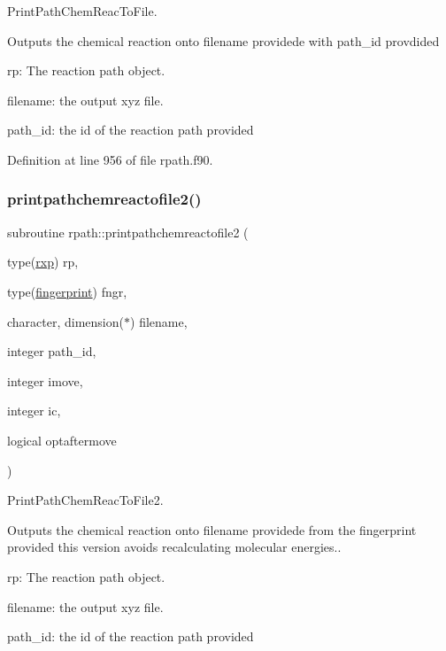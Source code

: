 Print\+Path\+Chem\+Reac\+To\+File. 

Outputs the chemical reaction onto filename providede with path\+\_\+id provdided


\begin{DoxyItemize}
\item rp\+: The reaction path object.
\item filename\+: the output xyz file.
\item path\+\_\+id\+: the id of the reaction path provided 
\end{DoxyItemize}

Definition at line 956 of file rpath.\+f90.

\mbox{\label{namespacerpath_a2b31a5d2057f07a4b4e50d900e7287cc}} 
\subsubsection{\texorpdfstring{printpathchemreactofile2()}{printpathchemreactofile2()}}
{\footnotesize\ttfamily subroutine rpath\+::printpathchemreactofile2 (\begin{DoxyParamCaption}\item[{type(\mbox{\hyperlink{structrpath_1_1rxp}{rxp}})}]{rp,  }\item[{type(\mbox{\hyperlink{structrpath_1_1fingerprint}{fingerprint}})}]{fngr,  }\item[{character, dimension($\ast$)}]{filename,  }\item[{integer}]{path\+\_\+id,  }\item[{integer}]{imove,  }\item[{integer}]{ic,  }\item[{logical}]{optaftermove }\end{DoxyParamCaption})}



Print\+Path\+Chem\+Reac\+To\+File2. 

Outputs the chemical reaction onto filename providede from the fingerprint provided this version avoids recalculating molecular energies..


\begin{DoxyItemize}
\item rp\+: The reaction path object.
\item filename\+: the output xyz file.
\item path\+\_\+id\+: the id of the reaction path provided 
\end{DoxyItemize}

